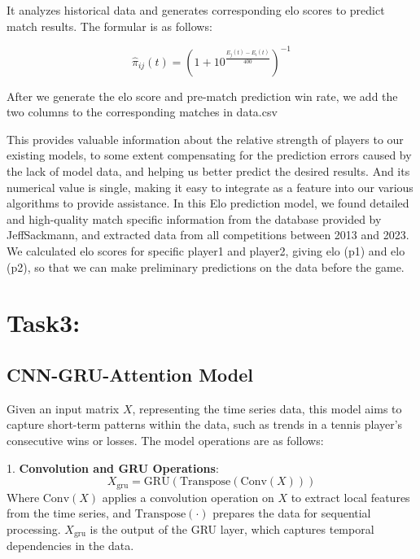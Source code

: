 \documentclass{mcmthesis}
\begin{document}
It analyzes historical data and generates %
corresponding elo scores to predict match results. The formular is as follows:

\[
\hat{\pi}_{ij}(t) = \left(1 + 10^{\frac{E_j(t) - E_i(t)}{400}} \right)^{-1}
\]

After we generate the elo score and pre-match prediction win rate, we add the two columns to the corresponding %
matches in data.csv

This provides valuable information about the relative strength of players to our existing %
models, to some extent compensating %
for the prediction errors caused by the lack of model data, and helping us better predict %
the desired results. And its numerical value is single, making it easy to integrate as a %
feature into our various algorithms to provide assistance. In this Elo prediction model, %
we found detailed and high-quality match specific information from the database provided %
by JeffSackmann, and extracted data from all competitions between 2013 and 2023. We %
calculated elo scores for specific player1 and player2, giving elo (p1) and elo (p2), so %
that we can make preliminary predictions on the data before the game.




\section{Task3: }



\subsection{CNN-GRU-Attention Model}

Given an input matrix $X$, representing the time series data, this model aims to capture short-term patterns within the data, %
such as trends in a tennis player's consecutive wins or losses. The model operations are as follows:

1. \textbf{Convolution and GRU Operations}:
\begin{equation}
    X_{\text{gru}} = \text{GRU}(\text{Transpose}(\text{Conv}(X)))
\end{equation}
Where $\text{Conv}(X)$ applies a convolution operation on $X$ to extract local features from the time series, %
and $\text{Transpose}(\cdot)$ prepares the data for sequential processing. $X_{\text{gru}}$ is the output of the GRU layer, %
which captures temporal dependencies in the data.
\end{document}
